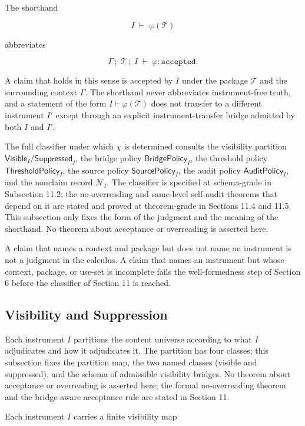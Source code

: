 \documentclass[11pt]{article}
\theoremstyle{definition}
\begin{document}
The shorthand

\[
I\;\vdash\;\varphi(\mathcal T)
\]

abbreviates

\[
\Gamma\,;\;\mathcal T\,;\;I\;\vdash\;\varphi:\texttt{accepted}.
\]

A claim that holds in this sense is accepted by \(I\) under the package \(\mathcal T\) and the surrounding context \(\Gamma\). The shorthand never abbreviates instrument-free truth, and a statement of the form \(I\vdash\varphi(\mathcal T)\) does not transfer to a different instrument \(I'\) except through an explicit instrument-transfer bridge admitted by both \(I\) and \(I'\).

The full classifier under which \(\chi\) is determined consults the visibility partition \(\mathsf{Visible}_I/\mathsf{Suppressed}_I\), the bridge policy \(\mathsf{BridgePolicy}_I\), the threshold policy \(\mathsf{ThresholdPolicy}_I\), the source policy \(\mathsf{SourcePolicy}_I\), the audit policy \(\mathsf{AuditPolicy}_I\), and the nonclaim record \(\mathcal N_I\). The classifier is specified at schema-grade in Subsection 11.2; the no-overreading and same-level self-audit theorems that depend on it are stated and proved at theorem-grade in Sections 11.4 and 11.5. This subsection only fixes the form of the judgment and the meaning of the shorthand. No theorem about acceptance or overreading is asserted here.

A claim that names a context and package but does not name an instrument is not a judgment in the calculus. A claim that names an instrument but whose context, package, or use-set is incomplete fails the well-formedness step of Section 6 before the classifier of Section 11 is reached.

\subsection{Visibility and Suppression}

Each instrument \(I\) partitions the content universe according to what \(I\) adjudicates and how it adjudicates it. The partition has four classes; this subsection fixes the partition map, the two named classes (visible and suppressed), and the schema of admissible visibility bridges. No theorem about acceptance or overreading is asserted here; the formal no-overreading theorem and the bridge-aware acceptance rule are stated in Section 11.

Each instrument \(I\) carries a finite visibility map
\end{document}
